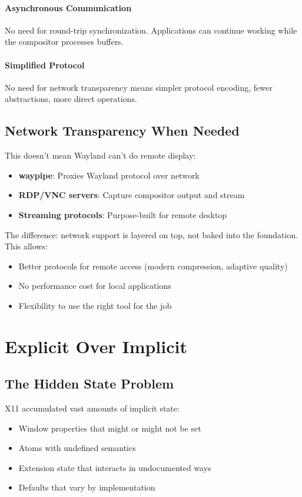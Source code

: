 \paragraph{Asynchronous Communication}
No need for round-trip synchronization. Applications can continue working while the compositor processes buffers.

\paragraph{Simplified Protocol}
No need for network transparency means simpler protocol encoding, fewer abstractions, more direct operations.

\subsection{Network Transparency When Needed}

This doesn't mean Wayland can't do remote display:

\begin{itemize}
    \item \textbf{waypipe}: Proxies Wayland protocol over network
    \item \textbf{RDP/VNC servers}: Capture compositor output and stream
    \item \textbf{Streaming protocols}: Purpose-built for remote desktop
\end{itemize}

The difference: network support is layered on top, not baked into the foundation. This allows:
\begin{itemize}
    \item Better protocols for remote access (modern compression, adaptive quality)
    \item No performance cost for local applications
    \item Flexibility to use the right tool for the job
\end{itemize}

\section{Explicit Over Implicit}

\subsection{The Hidden State Problem}

X11 accumulated vast amounts of implicit state:
\begin{itemize}
    \item Window properties that might or might not be set
    \item Atoms with undefined semantics
    \item Extension state that interacts in undocumented ways
    \item Defaults that vary by implementation
\end{itemize}

